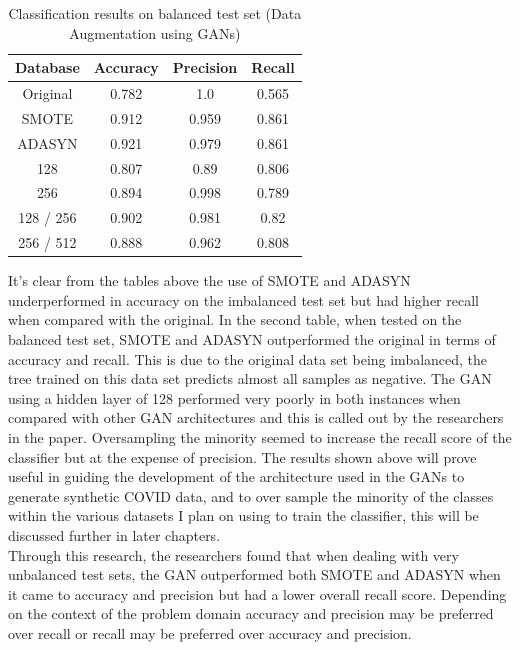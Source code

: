 \begin{table}[H]
    \centering
    \begin{tabular}{|c|c|c|c|}
         \hline
         Database
         & Accuracy
         & Precision 
         & Recall \\
         \hline
         Original & 0.782 & 1.0 & 0.565\\
         SMOTE & 0.912 & 0.959 & 0.861 \\
         ADASYN & 0.921 & 0.979 & 0.861 \\
         128 & 0.807 & 0.89 & 0.806 \\
         256 & 0.894 & 0.998 & 0.789 \\
         128 / 256 & 0.902 & 0.981 & 0.82 \\
         256 / 512 & 0.888 & 0.962 & 0.808\\
         \hline
    \end{tabular}
    \caption{Classification results on balanced test set (Data Augmentation using GANs)\cite{litReviewGanDataAugmentation}}
    \label{tab:Classification results on imbalanced test set (Data Augmentation using GANs)}
\end{table}
It's clear from the tables above the use of SMOTE and ADASYN underperformed in accuracy on the imbalanced test set but had higher recall when compared with the original.  In the second table, when tested on the balanced test set, SMOTE and ADASYN outperformed the original in terms of accuracy and recall. This is due to the original data set being imbalanced, the tree trained on this data set predicts almost all samples as negative. The GAN using a hidden layer of 128 performed very poorly in both instances when compared with other GAN architectures and this is called out by the researchers in the paper.  Oversampling the minority seemed to increase the recall score of the classifier but at the expense of precision.  The results shown above will prove useful in guiding the development of the architecture used in the GANs to generate synthetic COVID data, and to over sample the minority of the classes within the various datasets I plan on using to train the classifier, this will be discussed further in later chapters.
\\
Through this research, the researchers found that when dealing with very unbalanced test sets, the GAN outperformed both SMOTE and ADASYN when it came to accuracy and precision but had a lower overall recall score.  Depending on the context of the problem domain accuracy and precision may be preferred over recall or recall may be preferred over accuracy and precision.
